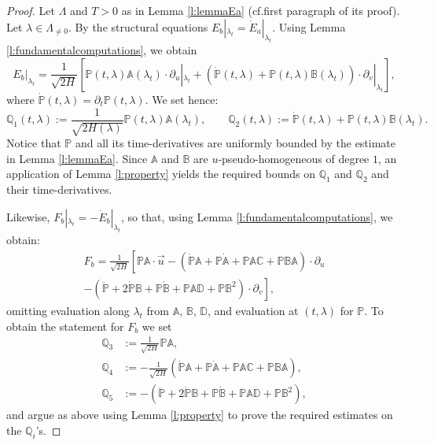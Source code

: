 \documentclass[11pt,a4paper]{article}
\theoremstyle{plain}
\theoremstyle{definition}
\theoremstyle{remark}
\numberwithin{equation}{section}
\newcommand{\A}{\mathbb{A}}
\newcommand{\B}{\mathbb{B}}
\newcommand{\C}{\mathbb{C}}
\newcommand{\D}{\mathbb{D}}
\renewcommand{\P}{\mathbb{P}}
\newcommand{\Q}{\mathbb{Q}}
\begin{document}
\begin{proof}
Let $\Lambda$ and $T>0$ as in Lemma \ref{l:lemmaEa} (cf.\@ first paragraph of its proof). Let $\lambda \in \Lambda_{\neq 0}$. By the structural equations $E_b|_{\lambda_t} = \dot{E}_a|_{\lambda_t}$. Using Lemma \ref{l:fundamentalcomputations}, we obtain
\begin{equation}\label{eq:Ebexplicit}
E_b|_{\lambda_t}  = \frac{1}{\sqrt{2H}} \left[ \P(t,\lambda)\A(\lambda_t) \cdot \partial_u|_{\lambda_t} +  (\dot{\P}(t,\lambda)+ \P(t,\lambda) \B(\lambda_t) )\cdot \partial_v|_{\lambda_t}\right],
\end{equation}
where $\dot{\P}(t,\lambda) =\partial_t \P(t,\lambda)$. We set hence:
\begin{equation}
 \Q_1(t,\lambda):= \frac{1}{\sqrt{2H(\lambda)}}\P(t,\lambda)\A(\lambda_t), \qquad \Q_2(t,\lambda):=\dot{\P}(t,\lambda) + \P(t,\lambda)\B(\lambda_t).
\end{equation}
Notice that $\P$ and all its time-derivatives are uniformly bounded by the estimate in Lemma \ref{l:lemmaEa}. Since $\A$ and $\B$ are $u$-pseudo-homogeneous of degree $1$, an application of Lemma \ref{l:property} yields the required bounds on $\Q_1$ and $\Q_2$ and their time-derivatives.

Likewise, $F_b|_{\lambda_t} = - \dot{E}_b|_{\lambda_t}$, so that, using Lemma \ref{l:fundamentalcomputations}, we obtain:
\begin{multline}
F_b = \frac{1}{\sqrt{2H}} \left[ 
\P\A \cdot \vec{u}
- (\dot{\P} \A + \P\dot{\A}+\P\A\C + \P\B\A)\cdot \partial_u \right. \\
\left. - (\ddot{\P} + 2 \dot{\P} \B + \P\dot{\B} + \P\A\D + \P\B^2)\cdot\partial_v
\right],
\end{multline}
omitting evaluation along $\lambda_t$ from $\A$, $\B$, $\D$, and evaluation at $(t,\lambda)$ for $\P$. To obtain the statement for $F_b$ we set
\begin{align}
\Q_3 & :=  \frac{1}{\sqrt{2H}} \P\A, \\
\Q_4 & := -\frac{1}{\sqrt{2H}} (\dot{\P} \A + \P\dot{\A}+\P\A\C + \P\B\A), \\
\Q_5 & := -(\ddot{\P} + 2 \dot{\P} \B + \P\dot{\B} + \P\A\D + \P\B^2),
\end{align}
and argue as above using Lemma \ref{l:property} to prove the required estimates on the $\Q_i$'s.
\end{proof}
\end{document}
